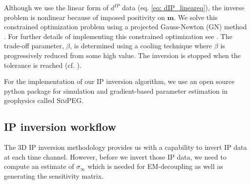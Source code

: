 \documentclass[extra,mreferee]{gji}
\newcommand{\SimPEG}{\textsc{SimPEG}\xspace}
\newcommand{\siginf}{\sigma_\infty}
\newcommand{\dip}{d^{IP}}
\begin{document}
Although we use the linear form of $\dip$ data (eq. \ref{eq: dIP_lineareq}), the inverse problem is nonlinear because of imposed positivity on $\mathbf{m}$.
We solve this constrained optimization problem using a projected Gauss-Newton (GN) method \cite[]{Kelley}. For further details of implementing this constrained optimization see \cite{Marchant2012b}.
The trade-off parameter, $\beta$, is determined using a cooling technique where $\beta$ is progressively reduced from some high value. The inversion is stopped when the tolerance is reached (cf. \cite{Nocedal1999,DougTutorial,Kang2015a}).

For the implementation of our IP inversion algorithm, we use an open source python package for simulation and gradient-based parameter estimation in geophysics called \SimPEG \cite[]{Cockett2015}.


\subsection{IP inversion workflow}
The 3D IP inversion methodology provides us with a capability to invert IP data at each time channel. However, before we invert those IP data, we need to compute an estimate of $\siginf$ which is needed for EM-decoupling as well as generating the sensitivity matrix.


\end{document}
